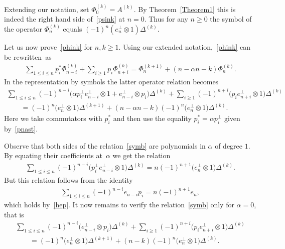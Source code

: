 \documentclass[11pt]{article}
\numberwithin{equation}{section}
\renewcommand\ge{\geqslant}
\renewcommand\le{\leqslant}
\begin{document}
Extending our notation, set $\Phi^{(k)}_0=A^{(k)}$.
By Theorem~\ref{Theorem1} this is indeed the right hand side of~\eqref{psink} at $n=0$.
Thus for any $n\ge0$ the symbol of the operator $\Phi^{(k)}_n$ equals $(-1)^{
n}(e_n^{\perp}\otimes1)\Delta^{(k)}$.

Let us now prove~\eqref{phink} for $n,k\ge1$.
Using our extended notation,~\eqref{phink} can be rewritten~as
\begin{gather*}
\sum_{1\le i\le n}p^{\ast}_i\Phi_{n-i}^{(k)}+\sum_{i\ge1}
p_i\Phi_{n+i}^{(k)}=\Phi^{(k+1)}_n+(
n-\alpha n-k)\Phi_n^{(k)}.
\end{gather*}
In the representation by symbols the latter operator relation becomes
\begin{gather}
\sum_{1\le i\le n}(-1)^{n-i}\big(\alpha p^{\perp}_i e_{n-i}^{\perp}\otimes1+e_{n-i}^{\perp}\otimes p_i\big)\Delta^{(k)}
+\sum_{i\ge1}(-1)^{n+i}\big(p_ie_{n+i}^{\perp}\otimes1\big)\Delta^{(k)}
\nonumber
\\
\qquad {}
=(-1)^{n}\big(e_n^{\perp}\otimes1\big)\Delta^{(k+1)}+(n-\alpha n-k)(-1)^{n}\big(e_n^{\perp}\otimes1\big)\Delta^{(k)}.
\label{symb}
\end{gather}
Here we take commutators with $p^{\ast}_i$ and then use the equality
$p^{\ast}_i=\alpha p^{\perp}_i$ given by~\eqref{pnast}.

Observe that both sides of the relation~\eqref{symb} are polynomials in $\alpha$ of degree
$1$.
By equating their coef\/f\/icients at~$\alpha$ we get the relation
\begin{gather*}
\sum_{1\le i\le n}(-1)^{n-i}\big(p^{\perp}_i e_{n-i}
^{\perp}\otimes1\big)\Delta^{(k)}=n(-1)^{n+1}
\big(e_n^{\perp}\otimes1\big)\Delta^{(k)}.
\end{gather*}
But this relation follows from the identity
\begin{gather*}
\sum_{1\le i\le n}(-1)^{n-i}e_{n-i}p_i=n(-1)^{n+1}e_n,
\end{gather*}
which holds by~\eqref{hep}.
It now remains to verify the relation~\eqref{symb} only for $\alpha=0$, that is
\begin{gather}
\sum_{1\le i\le n}(-1)^{n-i}\big(e_{n-i}^{\perp}
\otimes p_i\big)\Delta^{(k)}+\sum_{i\ge1}(-1)^{n+i}
\big(p_ie_{n+i}^{\perp}\otimes1\big)\Delta^{(k)}
\nonumber
\\
\qquad{}
=(-1)^{n}\big(e_n^{\perp}\otimes1\big)\Delta^{(k+1)}+(
n-k)(-1)^{n}\big(e_n^{\perp}\otimes1\big)\Delta^{(k)}.
\label{symbzero}
\end{gather}
\end{document}
